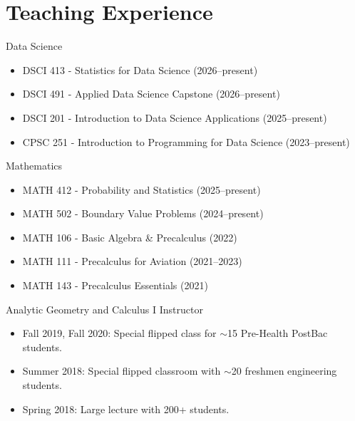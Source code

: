 \documentclass[10pt,a4paper,sans]{moderncv}
\newcounter{openSourceCounterReverse}
\newcommand{\openSource}[1]{%
	\addtocounter{openSourceCounterReverse}{-1}
	\addtocounter{openSourceCounter}{1}
	\cvitem{[\arabic{openSourceCounterReverse}]}{%
		#1
	}
}
\newcounter{ResearchSummaryCounterReverse}
\newcommand{\researchSummary}[1]{%
	\addtocounter{ResearchSummaryCounterReverse}{-1}
	\addtocounter{ResearchSummaryCounter}{1}
	\cvitem{[\arabic{ResearchSummaryCounterReverse}]}{%
		#1
	}
}
\begin{document}
	
		
		
	\section{Teaching Experience}
		{Data Science}{}{}{}
		{\begin{itemize}
				\item DSCI 413 - Statistics for Data Science (2026--present)
				\item DSCI 491 - Applied Data Science Capstone (2026--present)
				\item DSCI 201 - Introduction to Data Science Applications (2025--present)
				\item CPSC 251 - Introduction to Programming for Data Science (2023--present)
		\end{itemize}}
	\cventry{} 
		{Mathematics}{}{}{}
		{\begin{itemize}
			\item MATH 412 - Probability and Statistics (2025--present)
			\item MATH 502 - Boundary Value Problems (2024--present)
			\item MATH 106 - Basic Algebra \& Precalculus (2022)
			\item MATH 111 - Precalculus for Aviation (2021--2023)
			\item MATH 143 - Precalculus Essentials (2021)
		\end{itemize} } 
	
		{Analytic Geometry and Calculus I}
		{Instructor}{}{}
		{\begin{itemize}
			\item Fall 2019, Fall 2020: Special flipped class for $\sim$15 Pre-Health PostBac students. 
			\item Summer 2018: Special flipped classroom with $\sim$20 freshmen engineering students.
			\item Spring 2018: Large lecture with 200+ students.
		\end{itemize}}
	
\end{document}
